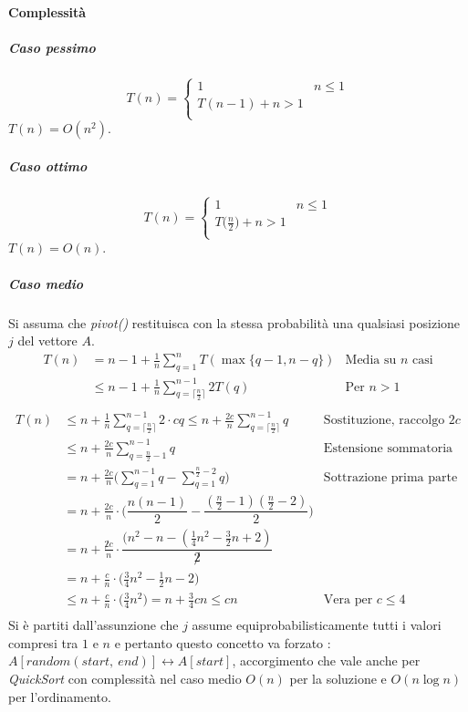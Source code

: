 \paragraph{Complessit\`a}
\subparagraph{Caso pessimo}
$$T(n) = 
\begin{cases}
	1 & n\le 1\\
	T(n - 1) + n > 1\\
\end{cases}
$$
$T(n) = O(n^2)$.
\subparagraph{Caso ottimo}
$$T(n) = 
\begin{cases}
	1 & n\le 1\\
	T\bigl(\frac{n}{2}\bigr) + n > 1\\
\end{cases}
$$
$T(n) = O(n)$.
\subparagraph{Caso medio}\mbox{}
Si assuma che \emph{pivot()} restituisca con la stessa probabilit\`a una qualsiasi posizione $j$ del vettore $A$.
\begin{align*}
	T(n) &= n - 1 + \frac{1}{n}\sum\limits_{q = 1}^n T(\max\{q - 1, n - q\}) & \text{Media su } n \text{ casi}\\
	     &\le n - 1 + \frac{1}{n}\sum\limits_{q = \lceil\frac{n}{2}\rceil}^{n-1}2T(q) & \text{Per } n > 1\\
\end{align*}
\begin{align*}
	T(n) &\le n + \frac{1}{n}\sum\limits_{q = \lceil\frac{n}{2}\rceil}^{n-1}2\cdot cq\le n + \frac{2c}{n}\sum\limits_{q = \lceil\frac{n}{2}\rceil}^{n-1}q &\text{Sostituzione, raccolgo } 2c\\
	     &\le n + \frac{2c}{n}\sum\limits_{q = \frac{n}{2}-1}^{n-1}q &\text{Estensione sommatoria}\\
	     &= n + \frac{2c}{n}\biggl(\sum\limits_{q = 1}^{n-1} q - \sum\limits_{q = 1}^{\frac{n}{2}-2} q\biggr) &\text{Sottrazione prima parte}\\
	     &= n + \frac{2c}{n}\cdot\biggl(\dfrac{n(n-1)}{2}-\dfrac{(\frac{n}{2} - 1)(\frac{n}{2} - 2)}{2}\biggr)\\
	     &= n + \frac{\not2c}{n}\cdot\dfrac{(n^2 - n - (\frac{1}{4}n^2-\frac{3}{2}n + 2)}{\not2}\\
	     &= n + \frac{c}{n}\cdot\biggl(\frac{3}{4}n^2-\frac{1}{2}n-2\biggr)\\
	     &\le n + \frac{c}{n}\cdot\biggl(\frac{3}{4}n^2\biggr) = n + \frac{3}{4}cn \le cn &\text{Vera per }c\le 4\\
\end{align*}
Si \`e partiti dall'assunzione che $j$ assume equiprobabilisticamente tutti i valori compresi tra $1$ e $n$ e pertanto questo concetto va forzato : $A[random(start,\ end)]\leftrightarrow
A[start]$, accorgimento che vale anche per \emph{QuickSort} con complessit\`a nel caso medio $O(n)$ per la soluzione e $O(n\log n)$ per l'ordinamento. 
